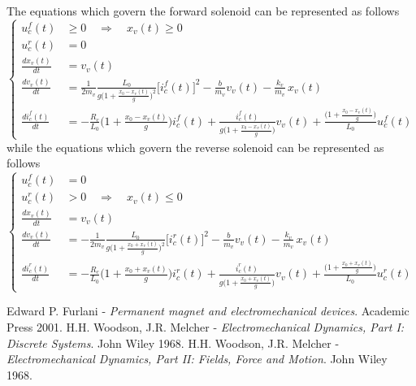 \documentclass[11pt,a4paper,oneside]{book}
\numberwithin{equation}{section}
\theoremstyle{it}
\theoremstyle{definition}
\begin{document}
The equations which govern the forward solenoid can be represented as follows 
\begin{equation}\label{solenoid_mech_eq_5}
	\left\lbrace \begin{aligned}
		u_c^f(t)&\ge0 \quad \Rightarrow \quad x_v(t)\ge 0 \\[6pt]
		u_c^r(t)&=0\\[6pt]
		\frac{dx_v(t)}{dt} &= v_v(t) \\[6pt]
		\frac{dv_v(t)}{dt} &= \frac{1}{2m_v}\frac{L_0}{g\Big(1+\frac{x_0 - x_v(t)}{g}\Big)^2}\Big[i_c^f(t)\Big]^2-\frac{b}{m_v} v_v(t) - \frac{k_v}{m_v}\,x_v(t)\\[6pt]
		\frac{di_c^f(t)}{dt} &=-\frac{R_c}{L_0}\Big(1+\frac{x_0 - x_v(t)}{g}\Big)i_c^f(t)+\frac{i_c^f(t)}{g\Big(1+\frac{x_0 - x_v(t)}{g}\Big)}v_v(t) +\frac{\Big(1+\frac{x_0 - x_v(t)}{g}\Big)}{L_0}u_c^f(t)
	\end{aligned}\right. 
\end{equation}
while the equations which govern the reverse solenoid can be represented as follows 
\begin{equation}\label{solenoid_mech_eq_6}
	\left\lbrace \begin{aligned}
		u_c^f(t)&=0 \\[6pt]
		u_c^r(t)&>0 \quad \Rightarrow \quad x_v(t)\le 0 \\[6pt]
		\frac{dx_v(t)}{dt} &= v_v(t) \\[6pt]
		\frac{dv_v(t)}{dt} &= -\frac{1}{2m_v}\frac{L_0}{g\Big(1+\frac{x_0 + x_v(t)}{g}\Big)^2}\Big[i_c^r(t)\Big]^2-\frac{b}{m_v} v_v(t) - \frac{k_v}{m_v}\,x_v(t)\\[6pt]
		\frac{di_c^r(t)}{dt} &=-\frac{R_c}{L_0}\Big(1+\frac{x_0 + x_v(t)}{g}\Big)i_c^r(t)+\frac{i_c^r(t)}{g\Big(1+\frac{x_0 + x_v(t)}{g}\Big)}v_v(t) +\frac{\Big(1+\frac{x_0 + x_v(t)}{g}\Big)}{L_0}u_c^r(t)
	\end{aligned}\right. 
\end{equation}






















\clearpage
\begin{thebibliography}{99}
	 Edward P. Furlani - \textit{Permanent magnet and electromechanical devices}. Academic Press 2001.	
	 H.H. Woodson, J.R. Melcher - \textit{Electromechanical Dynamics, Part I: Discrete Systems}. John Wiley 1968.
	 H.H. Woodson, J.R. Melcher - \textit{Electromechanical Dynamics, Part II: Fields, Force and Motion}. John Wiley 1968.
\end{thebibliography}
\end{document}
